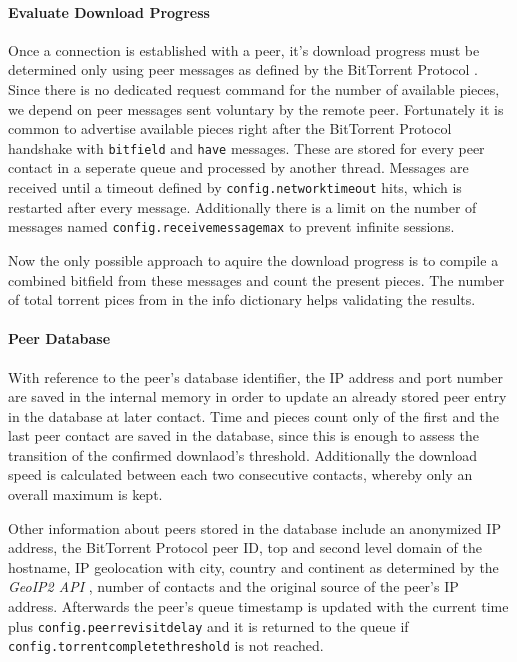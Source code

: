 \documentclass[10pt, a4paper]{scrartcl} %
\renewcommand{\_}{\origunderscore\allowbreak}
\newcommand{\config}[1]{\texttt{config.\allowbreak #1}}
\begin{document}
\paragraph{Evaluate Download Progress}
Once a connection is established with a peer, it's download progress must be determined only using peer messages as defined by the BitTorrent Protocol \cite{bep3}. Since there is no dedicated request command for the number of available pieces, we depend on peer messages sent voluntary by the remote peer. Fortunately it is common to advertise available pieces right after the BitTorrent Protocol handshake with \texttt{bitfield} and \texttt{have} messages. These are stored for every peer contact in a seperate queue and processed by another thread. Messages are received until a timeout defined by \config{network\_timeout} hits, which is restarted after every message. Additionally there is a limit on the number of messages named \config{receive\_message\_max} to prevent infinite sessions.

Now the only possible approach to aquire the download progress is to compile a combined bitfield from these messages and count the present pieces. The number of total torrent pices from in the info dictionary helps validating the results.

\paragraph{Peer Database}
With reference to the peer's database identifier, the IP address and port number are saved in the internal memory in order to update an already stored peer entry in the database at later contact. Time and pieces count only of the first and the last peer contact are saved in the database, since this is enough to assess the transition of the confirmed downlaod's threshold. Additionally the download speed is calculated between each two consecutive contacts, whereby only an overall maximum is kept. 

Other information about peers stored in the database include an anonymized IP address, the BitTorrent Protocol peer ID, top and second level domain of the hostname, IP geolocation with city, country and continent as determined by the \emph{GeoIP2 API} \cite{geoip2-api}, number of contacts and the original source of the peer's IP address. Afterwards the peer's queue timestamp is updated with the current time plus \config{peer\_revisit\_delay} and it is returned to the queue if \config{torrent\_complete\_threshold} is not reached.
\end{document}
